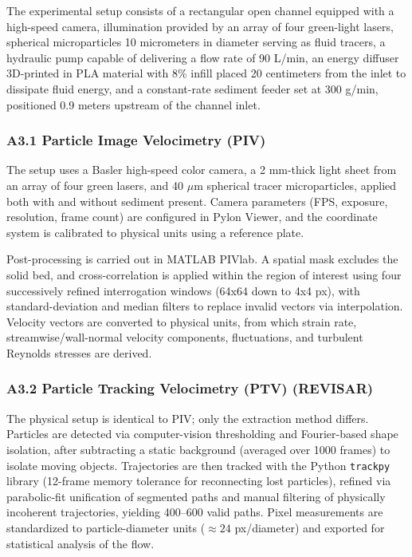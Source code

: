 The experimental setup consists of a rectangular open channel equipped with a high-speed camera, illumination provided by an array of four green-light lasers, spherical microparticles 10 micrometers in diameter serving as fluid tracers, a hydraulic pump capable of delivering a flow rate of 90 L/min, an energy diffuser 3D-printed in PLA material with 8\% infill placed 20 centimeters from the inlet to dissipate fluid energy, and a constant-rate sediment feeder set at 300 g/min, positioned 0.9 meters upstream of the channel inlet.

\subsubsection{A3.1 Particle Image Velocimetry (PIV)}

The setup uses a Basler high-speed color camera, a 2 mm-thick light sheet from an array of four green lasers, and 40 $\mu$m spherical tracer microparticles, applied both with and without sediment present. Camera parameters (FPS, exposure, resolution, frame count) are configured in Pylon Viewer, and the coordinate system is calibrated to physical units using a reference plate.

Post-processing is carried out in MATLAB PIVlab. A spatial mask excludes the solid bed, and cross-correlation is applied within the region of interest using four successively refined interrogation windows (64x64 down to 4x4 px), with standard-deviation and median filters to replace invalid vectors via interpolation. Velocity vectors are converted to physical units, from which strain rate, streamwise/wall-normal velocity components, fluctuations, and turbulent Reynolds stresses are derived.

\subsubsection{A3.2 Particle Tracking Velocimetry (PTV) (REVISAR)}

The physical setup is identical to PIV; only the extraction method differs. Particles are detected via computer-vision thresholding and Fourier-based shape isolation, after subtracting a static background (averaged over 1000 frames) to isolate moving objects. Trajectories are then tracked with the Python \texttt{trackpy} library (12-frame memory tolerance for reconnecting lost particles), refined via parabolic-fit unification of segmented paths and manual filtering of physically incoherent trajectories, yielding 400--600 valid paths. Pixel measurements are standardized to particle-diameter units (${\approx}24$ px/diameter) and exported for statistical analysis of the flow.

